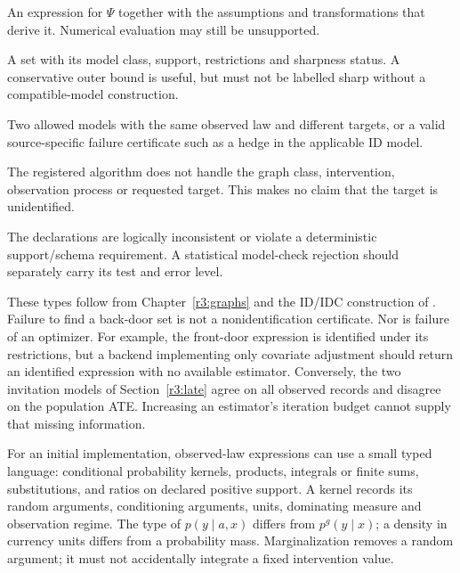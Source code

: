 \begin{description}[style=nextline,leftmargin=0pt,labelwidth=0pt,labelsep=0pt]
\item[Identified expression.] An expression for $\Psi$ together with the
assumptions and transformations that derive it. Numerical evaluation may
still be unsupported.
\item[Identified set or outer bound.] A set with its model class, support,
restrictions and sharpness status. A conservative outer bound is useful,
but must not be labelled sharp without a compatible-model construction.
\item[Nonidentification witness.] Two allowed models with the same observed
law and different targets, or a valid source-specific failure certificate
such as a hedge in the applicable ID model.
\item[Unsupported query.] The registered algorithm does not handle the
graph class, intervention, observation process or requested target.
This makes no claim that the target is unidentified.
\item[Incompatible specification.] The declarations are logically
inconsistent or violate a deterministic support/schema requirement.
A statistical model-check rejection should separately carry its test
and error level.
\end{description}

These types follow from Chapter~\ref{r3:graphs} and the ID/IDC construction
of \citet{id2006}. Failure to find a back-door set is not a
nonidentification certificate. Nor is failure of an optimizer. For
example, the front-door expression is identified under its restrictions,
but a backend implementing only covariate adjustment should return
an identified expression with no available estimator. Conversely, the
two invitation models of Section~\ref{r3:late} agree on all observed
records and disagree on the population ATE. Increasing an estimator's
iteration budget cannot supply that missing information.

For an initial implementation, observed-law expressions can use a small
typed language: conditional probability kernels, products, integrals or
finite sums, substitutions, and ratios on declared positive support.
A kernel records its random arguments, conditioning arguments, units,
dominating measure and observation regime. The type of
$p(y\mid a,x)$ differs from $p^g(y\mid x)$; a density in currency units
differs from a probability mass. Marginalization removes a random argument;
it must not accidentally integrate a fixed intervention value.

